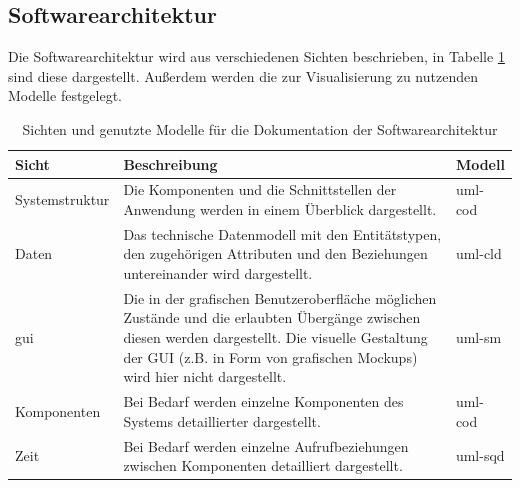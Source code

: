 \documentclass[a4paper,11pt,listof=numbered,glossary=totoc,parskip=half,toc=bib]{scrreprt}
\begin{document}
	\subsection{Softwarearchitektur}
	\label{subsec:softwarearchitektur}
	Die Softwarearchitektur wird aus verschiedenen Sichten beschrieben, in Tabelle \ref{tab:softwarearchitektur} sind diese dargestellt. Außerdem werden die zur Visualisierung zu nutzenden Modelle festgelegt.
	
	\begin{table}
		\centering
		\begin{tabularx}{\textwidth}{lXl}
			\toprule
			\textbf{Sicht} & \textbf{Beschreibung} & \textbf{Modell} \\
			\midrule
			Systemstruktur & Die Komponenten und die Schnittstellen der Anwendung werden in einem Überblick dargestellt. & \Gls{uml}-cod \\
			Daten & Das technische Datenmodell mit den Entitätstypen, den zugehörigen Attributen und den Beziehungen untereinander wird dargestellt.  & \Gls{uml}-cld \\
			\Gls{gui} & Die in der grafischen Benutzeroberfläche möglichen Zustände und die erlaubten Übergänge zwischen diesen werden dargestellt. Die visuelle Gestaltung der GUI (z.B. in Form von grafischen Mockups) wird hier nicht dargestellt. & \Gls{uml}-sm\\
			Komponenten & Bei Bedarf werden einzelne Komponenten des Systems detaillierter dargestellt. & \Gls{uml}-cod \\
			Zeit & Bei Bedarf werden einzelne Aufrufbeziehungen zwischen Komponenten detailliert dargestellt. & \Gls{uml}-sqd \\
			\bottomrule
		\end{tabularx}
		\caption{Sichten und genutzte Modelle für die Dokumentation der Softwarearchitektur}
		\label{tab:softwarearchitektur}
	\end{table}	
	
	
\end{document}
